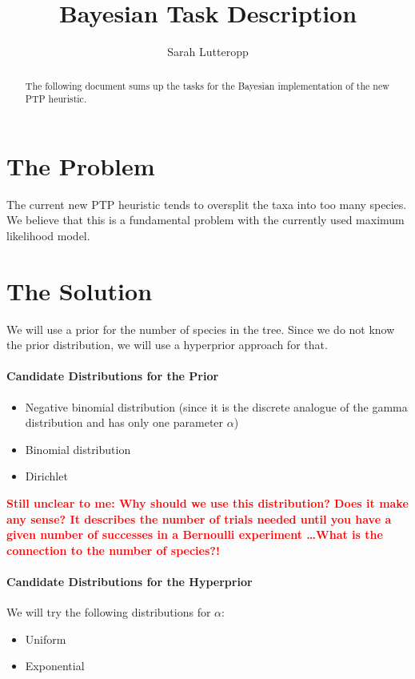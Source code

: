 \documentclass[10pt,a4paper]{article}
\title{Bayesian Task Description}
\author{Sarah Lutteropp}
\begin{document}
\maketitle

\begin{abstract}
The following document sums up the tasks for the Bayesian implementation of the new PTP heuristic.
\end{abstract}

\section{The Problem}
The current new PTP heuristic tends to oversplit the taxa into too many species. We believe that this is a fundamental problem with the currently used maximum likelihood model.

\section{The Solution}
We will use a prior for the number of species in the tree. Since we do not know the prior distribution, we will use a hyperprior approach for that.

\paragraph{Candidate Distributions for the Prior}
\begin{itemize}
\item Negative binomial distribution (since it is the discrete analogue of the gamma distribution and has only one parameter $\alpha$)
\item Binomial distribution
\item Dirichlet
\end{itemize}

\textcolor{red}{\textbf{Still unclear to me: Why should we use this distribution? Does it make any sense? It describes the number of trials needed until you have a given number of successes in a Bernoulli experiment \ldots What is the connection to the number of species?!}}

\paragraph{Candidate Distributions for the Hyperprior}
We will try the following distributions for $\alpha$:
\begin{itemize}
	\item Uniform
	\item Exponential
\end{itemize}
\end{document}
